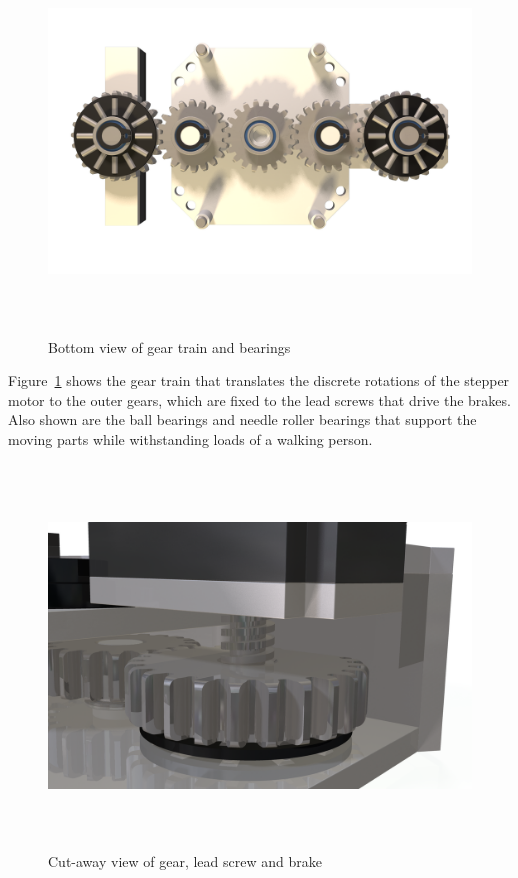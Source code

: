 \documentclass[12pt, landscape]{article}
\begin{document}
\begin{figure}[H]
\centering
\includegraphics[height=4in]{media/bottom.png}
\caption{Bottom view of gear train and bearings}
\label{bottom}
\end{figure}

Figure~\ref{bottom} shows the gear train that translates the discrete rotations of the stepper motor to the outer gears, which are fixed to the lead screws that drive the brakes.  Also shown are the ball bearings and needle roller bearings that support the moving parts while withstanding loads of a walking person.

\begin{figure}[H]
\centering
\includegraphics[height=4in]{media/back_brake_close.png}
\caption{Cut-away view of gear, lead screw and brake}
\label{brake}
\end{figure}
\end{document}
